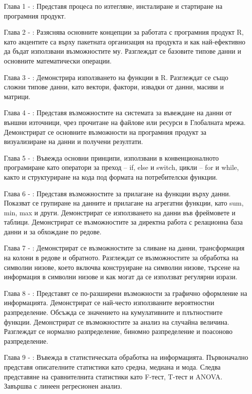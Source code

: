 Глава 1 - : Представя процеса по изтегляне, инсталиране и стартиране на програмния продукт.

Глава 2 - : Разяснява основните концепции за работата с програмния продукт R, като акцентите са върху пакетната организация на продукта и как най-ефективно да бъдат използвани възможностите му. Разглеждат се базовите типове данни и основните математически операции. 

Глава 3 - : Демонстрира използването на функции в R. Разглеждат се също сложни типове данни, като вектори, фактори, извадки от данни, масиви и матрици. 

Глава 4 - : Представя възможностите на системата за въвеждане на данни от външни източници, чрез прочитане на файлове или ресурси в Глобалната мрежа. Демонстрират се основните възможности на програмния продукт за визуализиране на данни и получени резултати.  

Глава 5 - : Въвежда основни принципи, използвани в конвенционалното програмиране като оператори за преход – if, else и switch, цикли – for и while, както и структуриране на кода под формата на потребителски функции.

Глава 6 - : Представя възможностите за прилагане на функции върху данни. Показват се групиране на данните и прилагане на агрегатни функции, като sum, min, max и други. Демонстрират се използването на данни във фреймовете и таблици. Демонстрират се възможностите за директна работа с релационна база данни и за обхождане по редове.

Глава 7 - : Демонстрират се възможностите за сливане на данни, трансформация на колони в редове и обратното. Разглеждат се възможностите за обработка на символни низове, което включва конструиране на символни низове, търсене на информация в символни низове и как могат да се използват регулярни изрази. 

Глава 8 - : Представят се по-разширени възможности за графично оформление на информацията. Демонстрират се най-често използваните вероятностни разпределение. Обсъжда се значението на кумулативните и плътностните функции. Демонстрират се възможностите за анализ на случайна величина. Разглеждат се нормално разпределение, биномно разпределение и поасоново разпределение.

Глава 9 - : Въвежда в статистическата обработка на информацията. Първоначално представя описателните статистики като средна, медиана и мода. Следва представяне на сравнителнита статистики като F-тест, T-тест и ANOVA. Завършва с линеен регресионен анализ. 

